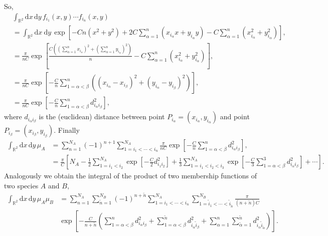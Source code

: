 \documentclass[12pt]{article}
\newcommand{\xd}{\mathrm{d}}
\numberwithin{equation}{section} %
\numberwithin{figure}{section} %
\theoremstyle{definition}
\begin{document}
So, 
\begin{align}
&\int_{{\mathbb R}^2} \xd x \, \xd y \,  f_{i_1} (x,y)\cdots f_{i_n} (x,y) \nonumber\\
&= \int_{{\mathbb R}^2} \xd x  \ \xd y \, \exp \left[ -Cn(x^2+y^2) +2C \sum_{\alpha=1}^n \left( x_{i_{\alpha}} x +y_{i_{\alpha}} y \right) - C \sum_{\alpha=1}^n \left(x_{i_{\alpha}}^2 + y_{i_{\alpha}}^2 \right) \right], \nonumber\\
&= \frac{\pi}{nC} \exp \left[ \frac{C(\left( \sum_{\alpha=1}^n x_{i_{\alpha}}\right)^2+\left( \sum_{\alpha=1}^n y_{i_{\alpha}}\right)^2)}{n}  - C \sum_{\alpha=1}^n (x_{i_{\alpha}}^2+y_{i_{\alpha}}^2)\right], \nonumber\\
&=  \frac{\pi}{nC} \exp \left[ - \frac{C}{n} \sum_{1=\alpha<\beta}^n \left((x_{i_\alpha}-x_{i_\beta})^2 + (y_{i_{\alpha}}-y_{i_{\beta}})^2 \right) \right], \nonumber\\
&=  \frac{\pi}{nC} \exp \left[ - \frac{C}{n} \sum_{1=\alpha < \beta}^n d_{i_{\alpha} i_{\beta}}^2 \right],
\end{align}
where $d_{i_{\alpha} i_{\beta}}$ is the (euclidean) distance between point $P_{i_{\alpha}} =(x_{i_{\alpha}} ,y_{i_{\alpha}} )$ and point $P_{i_{\beta}}=(x_{i_{\beta}},y_{i_{\beta}})$. Finally
\begin{align}
\int_{{\mathbb R}^2} \xd x \, \xd y \, \mu_A&= \sum_{n=1}^{N_A} (-1)^{n+1} \sum_{ 1=i_1< \cdots <i_n }^{N_A} \frac{\pi}{nC} \exp \left[ - \frac{C}{n} \sum_{1=\alpha < \beta}^n d_{i_{\alpha} i_{\beta}}^2 \right], \\
&= \frac{\pi}{C} \left[ N_A - \frac12  \sum_{ 1=i_1< i_2}^{N_A} \exp \left[- \frac{C}{2}  d_{i_{1} i_{2}}^2 \right] + \frac{1}{3}  \sum_{ 1=i_1< i_2 <i_3 }^{N_A}  \exp \left[ - \frac{C}{3} \sum_{1=\alpha < \beta}^3 d_{i_{\alpha} i_{\beta}}^2 \right] + \cdots
\right].
\end{align}
Analogously we obtain the integral of the product of two membership functions of two species $A$ and $B$,
\begin{align}
\int_{{\mathbb R}^2} \xd x \, \xd y \, \mu_A \mu_B &=  \sum_{n=1}^{N_A} \sum_{\tilde{n}=1}^{N_B} (-1)^{n+\tilde{n}} \sum_{ 1=i_1< \cdots <i_n }^{N_A} \sum_{ 1=\tilde{i}_1< \cdots <\tilde{i}_{\tilde{n}} }^{N_B} \frac{\pi}{(n+\tilde{n})C}
 \nonumber\\
& \exp \left[ - \frac{C}{n+\tilde{n}} \left( \sum_{1=\alpha < \beta}^n d_{i_{\alpha} i_{\beta}}^2 + \sum_{1=\alpha < \beta}^{\tilde{n}} d_{\tilde{i}_{\alpha} \tilde{i}_{\beta}}^2 +
\sum_{\alpha=1}^n \sum_{\tilde{\alpha}=1}^{\tilde{n}} 
d_{i_{\alpha} \tilde{i}_{\tilde{\alpha}}}^2
\right) \right].
\end{align}
\end{document}
